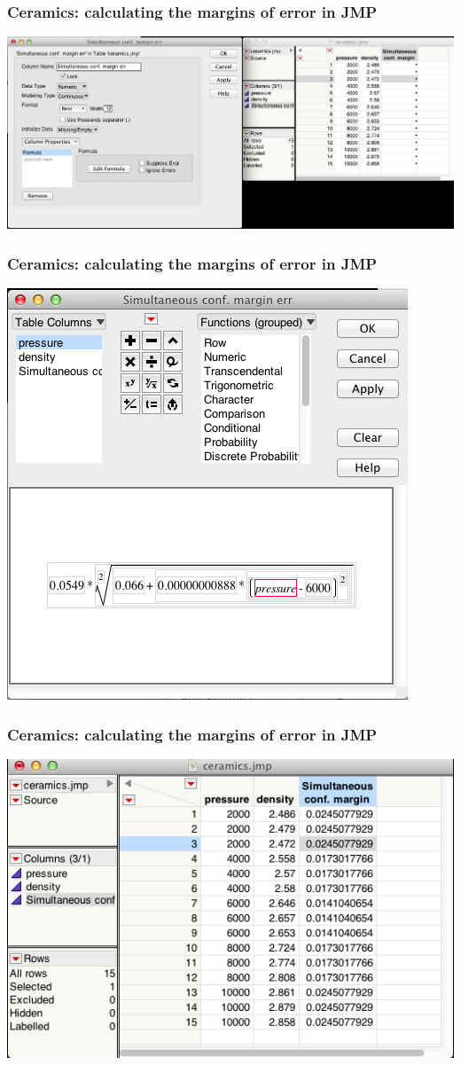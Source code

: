 \documentclass[handout]{beamer}\usepackage{graphicx, color}
\numberwithin{equation}{section}
\begin{document}
\begin{frame}
\frametitle{Ceramics: calculating the margins of error in JMP}
 \includegraphics{../../fig/jfs2.png}
\end{frame}

\begin{frame}
\frametitle{Ceramics: calculating the margins of error in JMP}
 \includegraphics{../../fig/jfs3.png}
\end{frame}

\begin{frame}
\frametitle{Ceramics: calculating the margins of error in JMP}
 \includegraphics{../../fig/jfs4.png}
\end{frame}
\end{document}
